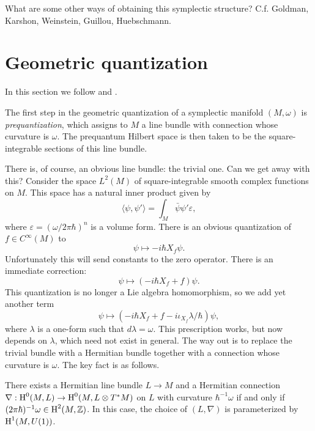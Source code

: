 \documentclass{amsart}
\begin{document}
{\color{red} What are some other ways of obtaining this symplectic structure? C.f. Goldman, Karshon, Weinstein,
Guillou, Huebschmann.}

\section{Geometric quantization}

In this section we follow \cite{wood} and \cite{hall}.

The first step in the geometric quantization of a symplectic manifold $(M,\omega)$ is \textit{prequantization},
which assigns to $M$ a line bundle with connection whose curvature is $\omega$. The prequantum Hilbert
space is then taken to be the square-integrable sections of this line bundle.

There is, of course, an obvious line bundle: the trivial one. Can we get away with this?
Consider the space $L^2(M)$ of
square-integrable smooth complex functions on $M$. This space has a natural inner product given by
\begin{equation*}
    \langle\psi,\psi'\rangle = \int_M \bar\psi \psi' \varepsilon,
\end{equation*}
where $\varepsilon=(\omega/2\pi\hbar)^n$ is a volume form. There is an obvious quantization of
$f\in C^\infty(M)$ to
\begin{equation*}
    \psi \mapsto -i\hbar X_f\psi.
\end{equation*}
Unfortunately this will send constants to the zero operator. There is an immediate correction:
\begin{equation*}
    \psi \mapsto (-i\hbar X_f + f)\psi.
\end{equation*}
This quantization is no longer a Lie algebra homomorphism, so we add yet another term
\begin{equation*}
    \psi \mapsto (-i\hbar X_f + f -i\iota_{X_f}\lambda/\hbar)\psi,
\end{equation*}
where $\lambda$ is a one-form such that $d\lambda=\omega$. This prescription works, but now
depends on $\lambda$, which need not exist in general. The way out is to replace the
trivial bundle with a Hermitian bundle together with a connection whose curvature is $\omega$.
The key fact is as follows.

\begin{theorem}
    There exists a Hermitian line bundle $L\to M$ and a Hermitian connection $\nabla:\operatorname{H}^0(M,L)\to\operatorname{H}^0(M, L\otimes T^*M)$ on $L$ with
    curvature $\hbar^{-1}\omega$ if and only if $(2\pi\hbar)^{-1}\omega\in \operatorname{H}^2(M,\mathbb{Z})$.
    In this case, the choice of $(L,\nabla)$ is parameterized by $\operatorname{H}^1(M,U(1))$.
\end{theorem}
\end{document}
